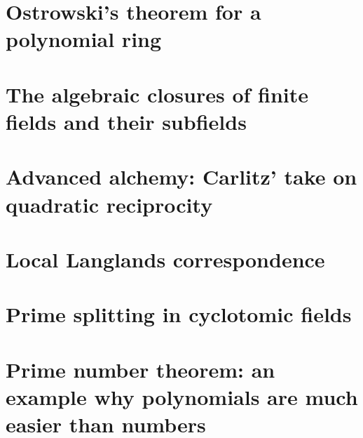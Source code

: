 \documentclass[a4paper]{memoir}
\begin{document}
\section{Ostrowski's theorem for a polynomial ring}


\section{The algebraic closures of finite fields and their subfields}


\section{Advanced alchemy: Carlitz' take on quadratic reciprocity}


\section{Local Langlands correspondence}


\section{Prime splitting in cyclotomic fields}


\section{Prime number theorem: an example why polynomials are much easier than numbers}




\end{document}
